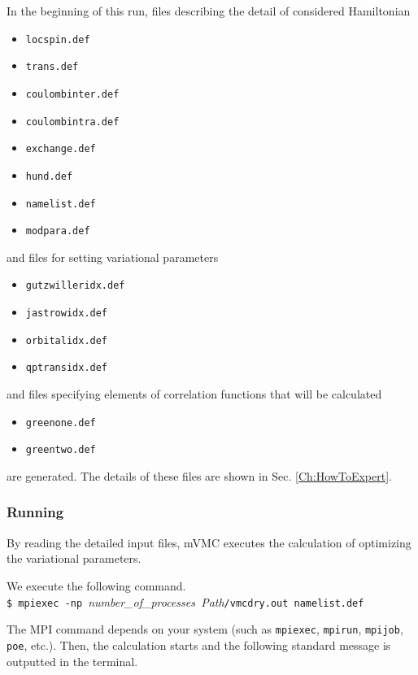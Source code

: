 In the beginning of this run,
files describing the detail of considered Hamiltonian
\begin{itemize}
\item \verb|locspin.def|
\item \verb|trans.def|
\item \verb|coulombinter.def|
\item \verb|coulombintra.def|
\item \verb|exchange.def|
\item \verb|hund.def|
\item \verb|namelist.def|
\item \verb|modpara.def|
\end{itemize}
and files for setting variational parameters
\begin{itemize}
\item \verb|gutzwilleridx.def|
\item \verb|jastrowidx.def|
\item \verb|orbitalidx.def|
\item \verb|qptransidx.def|
\end{itemize}
and files specifying elements of correlation functions
that will be calculated 
\begin{itemize}
\item \verb|greenone.def|
\item \verb|greentwo.def|
\end{itemize}
are generated. The details of these files are shown in Sec. \ref{Ch:HowToExpert}.

\subsubsection{Running}
By reading the detailed input files, mVMC executes the calculation of optimizing the variational parameters.

We execute the following command. \\
\verb|$ mpiexec -np |\textit{number\_of\_processes}\verb| |\textit{Path}\verb|/vmcdry.out namelist.def|

The MPI command depends on your system (such as \verb|mpiexec|, \verb|mpirun|, \verb|mpijob|,
\verb|poe|, etc.).
Then, the calculation starts and the following standard message is outputted in the terminal.

